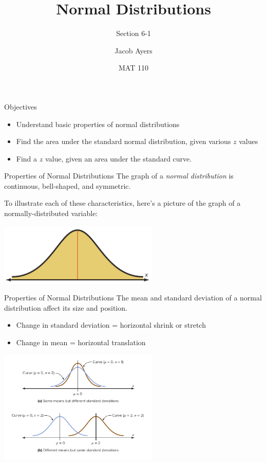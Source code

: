 \documentclass[t, aspectratio=169]{beamer}
\title[6-1]{Normal Distributions}
\subtitle{Section 6-1}
\author{Jacob Ayers}
\institute{Lesson \#17}
\date{MAT 110}
\newcommand{\?}{\stackrel{?}{=}}
\begin{document}
	
	\begin{frame}
		\titlepage
	\end{frame}
	
	\begin{frame}{Objectives}
		\begin{itemize}
			\item Understand basic properties of normal distributions
			\item Find the area under the standard normal distribution, given various $z$ values
			\item Find a $z$ value, given an area under the standard curve.
		\end{itemize}
	\end{frame}

	\begin{frame}{Properties of Normal Distributions}
		The graph of a \textit{normal distribution} is continuous, bell-shaped, and symmetric.
		
		To illustrate each of these characteristics, here's a picture of the graph of a normally-distributed variable: \pause
		
		\includegraphics[width=3in]{norm-dist.png}
	\end{frame}

	\begin{frame}{Properties of Normal Distributions}
		The mean and standard deviation of a normal distribution affect its size and position. \pause \begin{itemize}
			\item Change in standard deviation = horizontal shrink or stretch
			\item Change in mean = horizontal translation
		\end{itemize}
	
		\includegraphics[width=3in]{norm-dist-adjust.png}
	\end{frame}
\end{document}
